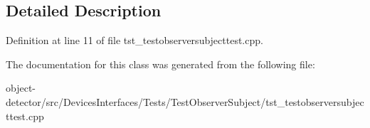 \subsection{Detailed Description}


Definition at line 11 of file tst\+\_\+testobserversubjecttest.\+cpp.



The documentation for this class was generated from the following file\+:\begin{DoxyCompactItemize}
\item 
object-\/detector/src/\+Devices\+Interfaces/\+Tests/\+Test\+Observer\+Subject/tst\+\_\+testobserversubjecttest.\+cpp\end{DoxyCompactItemize}
